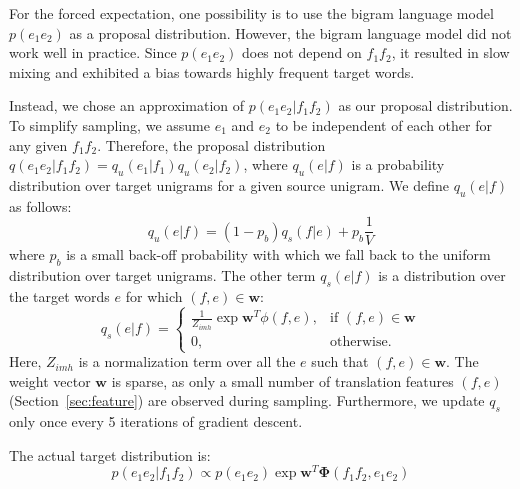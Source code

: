 For the forced expectation, one possibility is to use the bigram language model $p(e_1 e_2)$ as a proposal distribution.
However, the bigram language model did not work well in practice. 
Since $p(e_1 e_2)$ does not depend on $f_1 f_2$, it resulted in slow mixing and exhibited a bias towards highly frequent target words.

Instead, we chose an approximation of $p(e_1 e_2|f_1 f_2) $ as our proposal distribution. 
To simplify sampling, we assume $e_1$ and $e_2$ to be independent of each other for any given $f_1 f_2$.
Therefore, the proposal distribution $q(e_1 e_2 | f_1 f_2) = q_u(e_1|f_1) q_u(e_2|f_2)$, where $q_u(e|f)$ is a probability distribution over target unigrams for a given source unigram.
We define $q_u(e|f)$ as follows:
\begin{equation*}
q_u( e | f) = (1-p_b) q_s(f | e) + p_b \frac{1}{V}
\end{equation*}
where $p_b$ is a small back-off probability with which we fall back to the uniform distribution over target unigrams. The other term $q_s(e|f)$ is a distribution over the target words $e$ for which $(f,e) \in \mathbf{w}$:
\[
    q_s(e|f)= 
\begin{cases}
     \frac{1}{Z_{imh}} \exp{\mathbf{w}^T \phi(f, e)} ,& \text{if } (f,e) \in \mathbf{w}\\
    0,              & \text{otherwise}.
\end{cases}
\]
Here, $Z_{imh}$ is a normalization term over all the $e$ such that $(f,e) \in \mathbf{w}$.
The weight vector $\mathbf{w}$ is sparse, as only a small number of translation features $(f,e)$ (Section~\ref{sec:feature}) are observed during sampling. 
Furthermore, we update $q_s$ only once every 5 iterations of gradient descent.

The actual target distribution is: 
\begin{equation}
p (e_1e_2|f_1f_2) \propto p(e_1 e_2) \exp{\mathbf{w}^T\mathbf{\Phi}(f_1f_2, e_1e_2)} 
\end{equation}


